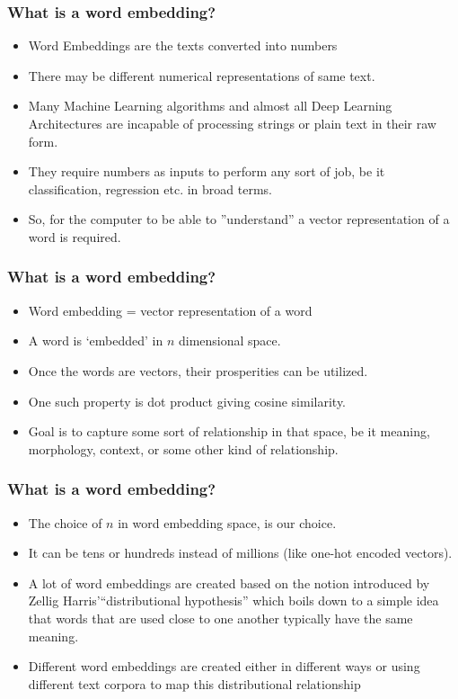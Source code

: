 \begin{frame}[fragile]\frametitle{What is a word embedding?}
\begin{itemize}
\item Word Embeddings are the texts converted into numbers
\item There may be different numerical representations of  same text. 
\item Many Machine Learning algorithms and almost all Deep Learning Architectures are incapable of processing strings or plain text in their raw form. 
\item They require numbers as inputs to perform any sort of job, be it classification, regression etc. in broad terms.
\item So, for the computer to be able to ''understand'' a vector representation of a word is required.
\end{itemize}
\end{frame}


\begin{frame}[fragile]\frametitle{What is a word embedding?}
  \begin{itemize}
    \item Word embedding = vector representation of a word
	\item A word is `embedded' in $n$ dimensional space.
	\item Once the words are vectors, their prosperities can be utilized.
	\item One such property is dot product giving cosine similarity.
	\item Goal is to capture some sort of relationship in that space, be it meaning, morphology, context, or some other kind of relationship.
  \end{itemize}


\end{frame}

\begin{frame}[fragile]\frametitle{What is a word embedding?}
  \begin{itemize}
    \item The choice of $n$ in word embedding space, is our choice.
	\item It can be tens or hundreds instead of millions (like one-hot encoded vectors).
	\item A lot of word embeddings are created based on the notion introduced by Zellig Harris'``distributional hypothesis'' which boils down to a simple idea that words that are used close to one another typically have the same meaning.
	\item Different word embeddings are created either in different ways or using different text corpora to map this distributional relationship
  \end{itemize}


\end{frame}


